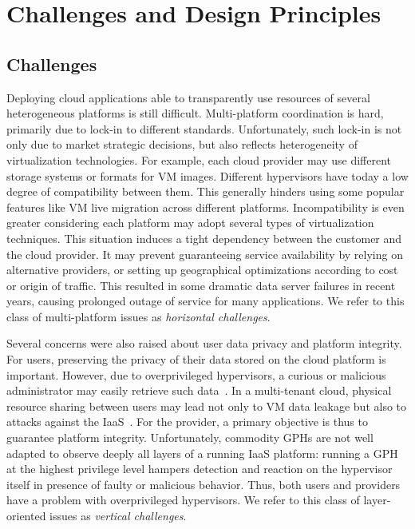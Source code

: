 \documentclass{sig-alternate}
\begin{document}
\section{Challenges and Design Principles}
\label{ref:challenges}

\subsection{Challenges}

\noindent Deploying cloud applications able to transparently use resources of several heterogeneous platforms is still difficult. 
Multi-platform coordination is hard, primarily due to lock-in to different standards. Unfortunately, such lock-in is not only due to market strategic decisions, but also reflects heterogeneity of virtualization technologies. For example, each cloud provider may use different storage systems or formats for VM images. Different hypervisors have today a low degree of compatibility between them. This generally hinders using some popular features like VM live migration across different platforms. Incompatibility is even greater considering each platform may adopt several types of virtualization techniques. This situation induces a tight dependency between the customer and the cloud provider. It may prevent guaranteeing service availability by relying on alternative providers, or setting up geographical optimizations according to cost or origin of traffic. This resulted in some dramatic data server failures in recent years, causing prolonged outage of service for many applications. We refer to this class of multi-platform issues as \textit{horizontal challenges}.

Several concerns were also raised about user data privacy and platform integrity. For users, preserving the privacy of their data stored on the cloud platform is important. However, due to overprivileged hypervisors, a curious or malicious administrator may easily retrieve such data~\cite{cloudvisor:zhang}. 
In a multi-tenant cloud, physical resource sharing between users may lead not only to VM data leakage but also to attacks against the IaaS~\cite{bot:att, sec:you}.
For the provider, a primary objective is thus to guarantee platform integrity. Unfortunately, commodity GPHs are not well adapted to observe deeply all layers of a running IaaS platform: running a GPH at the highest privilege level hampers detection and reaction on the hypervisor itself in presence of faulty or malicious behavior. Thus, both users and providers have a problem with overprivileged hypervisors.
We refer to this class of layer-oriented issues as \textit{vertical challenges}.
\end{document}
